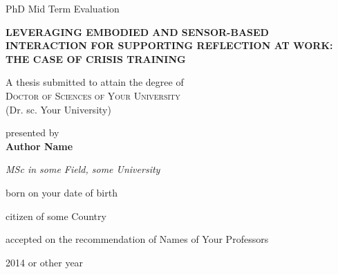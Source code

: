 \begin{titlepage}
    \begin{center}
    
        \vspace*{1cm}
        
       PhD Mid Term Evaluation
       
        \vspace*{1cm}
        
       \large{ \textbf{ \uppercase{Leveraging embodied and sensor-based interaction for supporting reflection at work:\\the case of crisis training}}}
        
        \vspace{0.5cm}
        
        \vspace{1.5cm}
 
        A thesis submitted to attain the degree of\\
        \large{\textsc{Doctor of Sciences of Your University}}\\ 
        (Dr. sc. Your University)
        
        \vspace{0.8cm}        
         
        presented by\\        
        \textbf{Author Name}
       
       \vspace{0.8cm}    
        \textit{MSc in some Field, some University}       
       
       \vspace{0.8cm}          
        born on your date of birth 
             
        \vspace{0.5cm}     
        citizen of some Country
        
         \vspace{2cm}
         accepted on the recommendation of
        Names of Your Professors              
       

        
        
        \vfill
  
        2014 or other year
        
 
 
     \end{center}
    \thispagestyle{empty}
    


\end{titlepage}

\newpage
\thispagestyle{empty} \mbox{}
